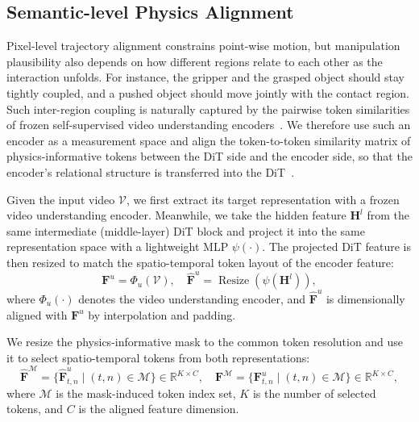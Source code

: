 \documentclass{llmxive}
\begin{document}
\subsection{Semantic-level Physics Alignment}

Pixel-level trajectory alignment constrains point-wise motion, but manipulation plausibility also
depends on how different regions relate to each other as the interaction unfolds. For instance,
the gripper and the grasped object should stay tightly coupled, and a pushed object should move
jointly with the contact region. Such inter-region coupling is naturally captured by the pairwise
token similarities of frozen self-supervised video understanding
encoders~\cite{bardes2024revisiting}. We therefore use such an encoder as a measurement space and
align the token-to-token similarity matrix of physics-informative tokens between the DiT side and
the encoder side, so that the encoder's relational structure is transferred into the DiT~\cite{zhang2025videorepa, simeoni2025dinov3}.

Given the input video $\mathcal{V}$, we first extract its target representation with a frozen video
understanding encoder. Meanwhile, we take the hidden feature $\mathbf{H}^{l}$ from the same intermediate (middle-layer) DiT
block and project it into the same representation space with a lightweight MLP $\psi(\cdot)$. The
projected DiT feature is then resized to match the spatio-temporal token layout of the encoder feature:
\begin{equation}
\mathbf{F}^{u}
=
\Phi_{u}(\mathcal{V}),
\quad
\hat{\mathbf{F}}^{u}
=
\operatorname{Resize}\left(\psi(\mathbf{H}^{l})\right),
\end{equation}
where $\Phi_{u}(\cdot)$ denotes the video understanding encoder, and
$\hat{\mathbf{F}}^{u}$ is dimensionally aligned with $\mathbf{F}^{u}$ by interpolation and padding.

We resize the physics-informative mask to the common token resolution and use it to select
spatio-temporal tokens from both representations:
\begin{equation}
\hat{\mathbf{F}}^{\mathcal{M}}
=
\{\hat{\mathbf{F}}^{u}_{t,n}\mid (t,n)\in\mathcal{M}\}
\in\mathbb{R}^{K\times C},
\quad
\mathbf{F}^{\mathcal{M}}
=
\{\mathbf{F}^{u}_{t,n}\mid (t,n)\in\mathcal{M}\}
\in\mathbb{R}^{K\times C},
\end{equation}
where $\mathcal{M}$ is the mask-induced token index set, $K$ is the number of selected tokens, and
$C$ is the aligned feature dimension.
\end{document}
